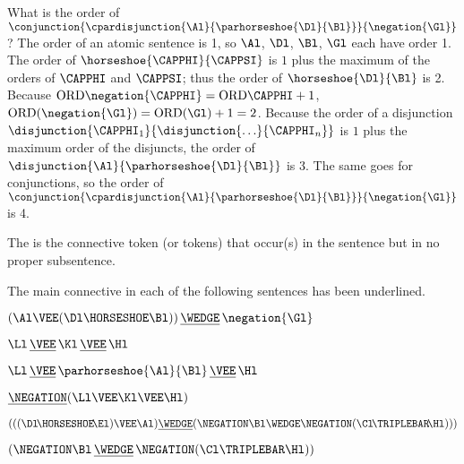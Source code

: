 \begin{majorILnc}{}
What is the order of $\conjunction{\cpardisjunction{\Al}{\parhorseshoe{\Dl}{\Bl}}}{\negation{\Gl}}$?
The order of an atomic sentence is 1, so $\Al$, $\Dl$, $\Bl$, $\Gl$ each have order 1.
The order of $\horseshoe{\CAPPHI}{\CAPPSI}$ is $1$ plus the maximum of the orders of $\CAPPHI$ and $\CAPPSI$; thus the order of $\horseshoe{\Dl}{\Bl}$ is 2.  
Because $\ORD{\negation{\CAPPHI}}=\ORD{\CAPPHI}+1$, $\ORD{(\negation{\Gl})}=\ORD{(\Gl)}+1=2$. 
Because the order of a disjunction $\disjunction{\CAPPHI_\integer{1}}{\disjunction{\ldots}{\CAPPHI_{\integer{n}}}}$ is $1$ plus the maximum order of the disjuncts, the order of $\disjunction{\Al}{\parhorseshoe{\Dl}{\Bl}}$ is 3.
The same goes for conjunctions, so the order of $\conjunction{\cpardisjunction{\Al}{\parhorseshoe{\Dl}{\Bl}}}{\negation{\Gl}}$ is 4.
\end{majorILnc}
\begin{majorILnc}{}
The  is the connective token (or tokens) that occur(s) in the sentence but in no proper subsentence.  
\end{majorILnc}
\begin{majorILnc}{}
The main connective in each of the following sentences has been underlined.
\begin{multicols}{2}
\begin{cenumerate}
\item $(\Al\VEE(\Dl\HORSESHOE\Bl))\, \underline{\WEDGE}\, \negation{\Gl}$
\item $\Ll\, \underline{\VEE}\, \Kl\, \underline{\VEE}\, \Hl $
\item $\Ll\, \underline{\VEE}\, \parhorseshoe{\Al}{\Bl}\, \underline{\VEE}\, \Hl $
\item $\underline{\NEGATION}(\Ll\VEE\Kl\VEE\Hl)$
\item $(((\Dl\!\HORSESHOE\!\El)\VEE\Al)\underline{\WEDGE}(\NEGATION\Bl\WEDGE\NEGATION(\Cl\!\TRIPLEBAR\!\Hl)))$
\item $(\NEGATION\Bl\, \underline{\WEDGE}\, \NEGATION(\Cl\TRIPLEBAR\Hl))$
\end{cenumerate}
\end{multicols}
\end{majorILnc}

